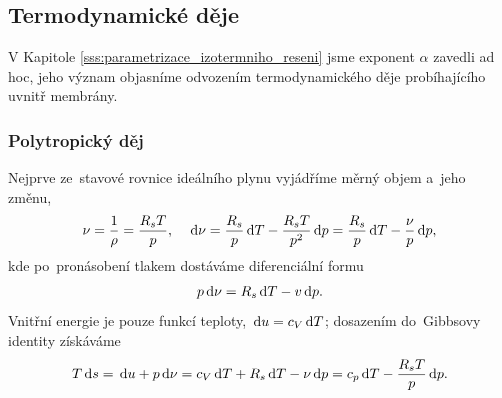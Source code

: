 \subsection{Termodynamické děje}\label{ss:termodynamicky_dej}
V Kapitole \ref{sss:parametrizace_izotermniho_reseni} jsme exponent $\alpha$ zavedli ad hoc, jeho význam objasníme odvozením termodynamického děje probíhajícího uvnitř membrány. 

\subsubsection{Polytropický děj}\label{sss:polytropicky_dej}
Nejprve ze~stavové rovnice ideálního plynu vyjádříme měrný objem a~jeho změnu,
\begin{equation}
    \nu=\frac{1}{\rho}=\frac{R_s T}{p},\quad \,\mathrm{d}{\nu}=\frac{R_s}{p}\,\mathrm{d}{T}-\frac{R_s T}{p^2}\,\mathrm{d}{p}=\frac{R_s }{p}\,\mathrm{d}{T}-\frac{\nu}{p}\,\mathrm{d}{p},
\end{equation}
kde po~pronásobení tlakem dostáváme diferenciální formu
\begin{equation}
    p\,\mathrm{d}{\nu}=R_s\,\mathrm{d}{T}-v\,\mathrm{d}{p}.
\end{equation}
Vnitřní energie je pouze funkcí teploty, $\,\mathrm{d}{u}=c_V\,\mathrm{d}{T}$; dosazením do~Gibbsovy identity získáváme
\begin{equation}
    T\,\mathrm{d}{s}=\,\mathrm{d}{u}+p\,\mathrm{d}{\nu}=c_V\,\mathrm{d}{T}+R_s\,\mathrm{d}{T}-\nu\,\mathrm{d}{p}=c_p\,\mathrm{d}{T}-\frac{R_s T}{p}\,\mathrm{d}{p}.
\end{equation}

